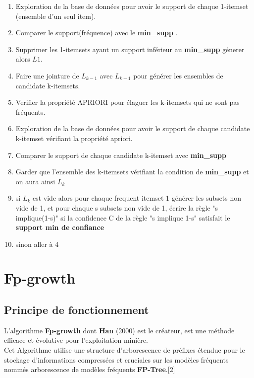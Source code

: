 \documentclass[12pt,a4paper,oneside]{book}
\begin{document}
	\begin{enumerate}
		\item Exploration de la base de données pour avoir le support de chaque 1-itemset (ensemble d'un seul item).
		\item Comparer le support(fréquence) avec le\textbf{ min\_supp} .
		\item  Supprimer les 1-itemsets ayant un support inférieur au \textbf{ min\_supp} génerer alors $L1$.
		\item Faire une jointure de $L_{k-1}$ avec $L_{k-1}$  pour générer les ensembles de candidate k-itemsets.
		\item Verifier la propriété APRIORI  pour élaguer les k-itemsets qui ne sont pas fréquents.
		\item Exploration de la base de données pour avoir le support de chaque candidate k-itemset vérifiant la propriété apriori.
		\item Comparer le support de chaque candidate k-itemset avec \textbf{ min\_supp}
		\item Garder que l'ensemble des k-itemsets vérifiant la condition de  \textbf{ min\_supp} et on aura ainsi $L_{k}$
		\item si $L_{k}$ est vide alors pour chaque frequent itemset 1 générer les subsets non vide de 1, et pour chaque s subsets non vide de 1, écrire la règle "s implique(1-s)" si la confidence C de la règle "s implique 1-s" satisfait le \textbf{support min de confiance }
		\item sinon aller à 4
	\end{enumerate}
	
	
	
	
	
	\newpage
	
	\section{Fp-growth}
	\subsection{Principe de fonctionnement}
	L'algorithme \textbf{Fp-growth} dont \textbf{Han} (2000) est le créateur, est une méthode efficace et évolutive pour l'exploitation minière. \\
	Cet Algorithme utilise une structure d'arborescence de préfixes étendue pour le stockage d'informations compressées et cruciales sur les modèles fréquents nommés arborescence de modèles fréquents \textbf{FP-Tree}.[2]\\
	
\end{document}
